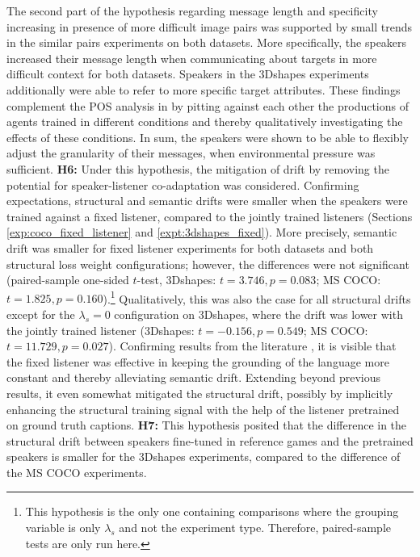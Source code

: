 The second part of the hypothesis regarding message length and specificity increasing in presence of more difficult image pairs was supported by small trends in the similar pairs experiments on both datasets. More specifically, the speakers increased their message length when communicating about targets in more difficult context for both datasets. Speakers in the 3Dshapes experiments additionally were able to refer to more specific target attributes. These findings complement the POS analysis in \cite{lee2019countering} by pitting against each other the productions of agents trained in different conditions and thereby qualitatively investigating the effects of these conditions. In sum, the speakers were shown to be able to flexibly adjust the granularity of their messages, when environmental pressure was sufficient.\newline
\textbf{H6:} Under this hypothesis, the mitigation of drift by removing the potential for speaker-listener co-adaptation was considered. Confirming expectations, structural and semantic drifts were smaller when the speakers were trained against a fixed listener, compared to the jointly trained listeners (Sections \ref{exp:coco_fixed_listener} and \ref{expt:3dshapes_fixed}). More precisely, semantic drift was smaller for fixed listener experiments for both datasets and both structural loss weight configurations; however, the differences were not significant (paired-sample one-sided $t$-test,  3Dshapes: $t = 3.746, p = 0.083$; MS COCO: $t = 1.825, p =0.160$).\footnote{This hypothesis is the only one containing comparisons where the grouping variable is only $\lambda_s$ and not the experiment type. Therefore, paired-sample tests are only run here.} Qualitatively, this was also the case for all structural drifts except for the $\lambda_s = 0$ configuration on 3Dshapes, where the drift was lower with the jointly trained listener (3Dshapes: $t=-0.156, p=0.549$;  MS COCO: $t = 11.729, p =0.027$). Confirming results from the literature \parencite{lazaridou2020multi}, it is visible that the fixed listener was effective in keeping the grounding of the language more constant and thereby alleviating semantic drift. Extending beyond previous results, it even somewhat mitigated the structural drift, possibly by implicitly enhancing the structural training signal with the help of the listener pretrained on ground truth captions.\newline
\textbf{H7:} This hypothesis posited that the difference in the structural drift between speakers fine-tuned in reference games and the pretrained speakers is smaller for the 3Dshapes experiments, compared to the difference of the MS COCO experiments.
